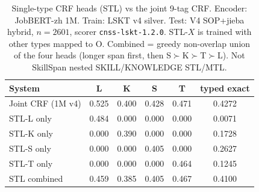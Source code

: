 \begin{table}[t]
\centering
\small
\caption{Single-type CRF heads (STL) vs the joint 9-tag CRF. Encoder: JobBERT-zh 1M. Train: LSKT v4 silver. Test: V4 SOP+jieba hybrid, $n{=}2601$, scorer \texttt{cnss-lskt-1.2.0}. STL-$X$ is trained with other types mapped to O. Combined = greedy non-overlap union of the four heads (longer span first, then S$\succ$K$\succ$T$\succ$L). Not SkillSpan nested SKILL/KNOWLEDGE STL/MTL.}
\label{tab:stl-v4}
\begin{tabular}{lccccc}
\toprule
System & L & K & S & T & typed exact \\
\midrule
Joint CRF (1M v4) & 0.525 & 0.400 & 0.428 & 0.471 & 0.4272 \\
STL-L only & 0.484 & 0.000 & 0.000 & 0.000 & 0.0071 \\
STL-K only & 0.000 & 0.390 & 0.000 & 0.000 & 0.1728 \\
STL-S only & 0.000 & 0.000 & 0.405 & 0.000 & 0.2627 \\
STL-T only & 0.000 & 0.000 & 0.000 & 0.464 & 0.1245 \\
STL combined & 0.459 & 0.385 & 0.405 & 0.467 & 0.4100 \\
\bottomrule
\end{tabular}
\end{table}
